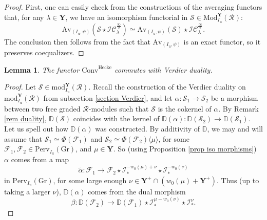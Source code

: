 \documentclass[11pt]{amsart}
\theoremstyle{plain}
\newtheorem{lem}[thm]{Lemma}
\theoremstyle{remark}
\numberwithin{equation}{section}
\begin{document}
 \begin{proof}
 First, one can easily check from the constructions of the averaging functors that, for any $\lambda\in\mathbf{Y}$, we have an isomorphism functorial in $\mathcal{S}\in\mathrm{Mod}^\mathbf{Y}_{I_\mathrm{u}}(\mathcal{R})$:
 $$\mathrm{Av}_{(I_\mathrm{u},\psi)}(\mathcal{S}\star\mathcal{IC}^\frac{\infty}{2}_\lambda)\simeq \mathrm{Av}_{(I_\mathrm{u},\psi)}(\mathcal{S})\star\mathcal{IC}^\frac{\infty}{2}_\lambda. $$
 The conclusion then follows from the fact that $\mathrm{Av}_{(I_\mathrm{u},\psi)}$ is an exact functor, so it preserves coequalizers.
 \end{proof}
 \begin{lem}\label{lem verdier commute}
	The functor $\mathrm{Conv}^{\mathrm{Hecke}}$ commutes with Verdier duality.
\end{lem}
\begin{proof}
    Let $\mathcal{S}\in \mathrm{mod}^\mathbf{Y}_{I_\mathrm{u}}(\mathcal{R})$. Recall the construction of the Verdier duality on $ \mathrm{mod}^\mathbf{Y}_{I_\mathrm{u}}(\mathcal{R})$ from subsection \ref{section Verdier}, and let $\alpha:\mathcal{S}_1\to \mathcal{S}_2$ be a morphism between two free graded $\mathcal{R}$-modules such that $\mathcal{S}$ is the cokernel of $\alpha$. By Remark \ref{rem duality}, $\mathbb{D}(\mathcal{S})$ coincides with the kernel of $\mathbb{D}(\alpha):\mathbb{D}(\mathcal{S}_2)\to \mathbb{D}(\mathcal{S}_1)$. Let us spell out how $\mathbb{D}(\alpha)$ was constructed. By additivity of $\mathbb{D}$, we may and will assume that $\mathcal{S}_1\simeq\Phi(\mathcal{F}_1)$ and $\mathcal{S}_2\simeq\Phi(\mathcal{F}_2)\langle\mu\rangle$, for some $\mathcal{F}_1,\mathcal{F}_2\in \mathrm{Perv}_{I_\mathrm{u}}(\mathrm{Gr})$, and $\mu\in\mathbf{Y}$. So (using Proposition \ref{prop iso morphisms}) $\alpha$ comes from a map
    $$\tilde{\alpha}:\mathcal{F}_1\to \mathcal{F}_2\star\mathcal{I}^{-w_0(\mu)+\nu}_*\star\mathcal{I}^{-w_0(\nu)}_*$$
    in $\mathrm{Perv}_{I_\mathrm{u}}(\mathrm{Gr})$, for some large enough $\nu\in \mathbf{Y}^+\cap(w_0(\mu)+\mathbf{Y}^+)$. Thus (up to taking a larger $\nu$), $\mathbb{D}(\alpha)$ comes from the dual morphism
    $$\beta:\mathbb{D}(\mathcal{F}_2)\to \mathbb{D}(\mathcal{F}_1)\star\mathcal{I}^{\mu-w_0(\nu)}_*\star\mathcal{I}^{\nu}_*.$$
    

\end{proof}
\end{document}
